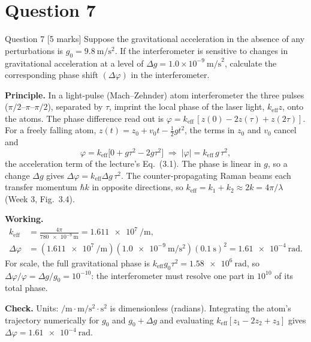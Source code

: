 \documentclass[11pt]{article}
\begin{document}
\section{Question 7}

\begin{problembox}{Question 7 \hfill [5 marks]}
Suppose the gravitational acceleration in the absence of any perturbations is
$g_0 = 9.8~\mathrm{m}/\mathrm{s}^2$. If the interferometer is sensitive to changes in gravitational
acceleration at a level of $\Delta g = 1.0\times10^{-9}~\mathrm{m/s}^2$, calculate the corresponding
phase shift $(\Delta\varphi)$ in the interferometer.
\end{problembox}

\textbf{Principle.} In a light-pulse (Mach--Zehnder) atom interferometer the three pulses
($\pi/2$--$\pi$--$\pi/2$), separated by $\tau$, imprint the local phase of the laser light,
$k_{\mathrm{eff}}z$, onto the atoms. The phase difference read out is
$\varphi = k_{\mathrm{eff}}\,[z(0)-2z(\tau)+z(2\tau)]$. For a freely falling atom,
$z(t) = z_0+v_0t-\tfrac12 g t^2$, the terms in $z_0$ and $v_0$ cancel and
\[
\varphi = k_{\mathrm{eff}}\big[0 + g\tau^2 - 2g\tau^2\big] \;\Rightarrow\; |\varphi| = k_{\mathrm{eff}}\,g\,\tau^2 ,
\]
the acceleration term of the lecture's Eq.~(3.1). The phase is linear in $g$, so a change $\Delta g$
gives $\Delta\varphi = k_{\mathrm{eff}}\Delta g\,\tau^2$. The counter-propagating Raman beams each
transfer momentum $\hbar k$ in opposite directions, so $k_{\mathrm{eff}} = k_1+k_2 \approx 2k = 4\pi/\lambda$
(Week 3, Fig.~3.4).

\textbf{Working.}
\begin{align*}
k_{\mathrm{eff}} &= \frac{4\pi}{\SI{780e-9}{\metre}} = \SI{1.611e7}{\per\metre},\\
\Delta\varphi &= (\SI{1.611e7}{\per\metre})(\SI{1.0e-9}{\metre\per\second\squared})(\SI{0.1}{\second})^2
= \SI{1.61e-4}{\radian}.
\end{align*}
For scale, the full gravitational phase is $k_{\mathrm{eff}}g_0\tau^2 = \SI{1.58e6}{\radian}$, so
$\Delta\varphi/\varphi = \Delta g/g_0 = 10^{-10}$: the interferometer must resolve one part in
$10^{10}$ of its total phase.

\textbf{Check.} Units: $\si{\per\metre}\cdot\si{\metre\per\second\squared}\cdot\si{\second\squared}$ is
dimensionless (radians). Integrating the atom's trajectory numerically for $g_0$ and
$g_0+\Delta g$ and evaluating $k_{\mathrm{eff}}[z_1-2z_2+z_3]$ gives
$\Delta\varphi = \SI{1.61e-4}{\radian}$.
\end{document}
